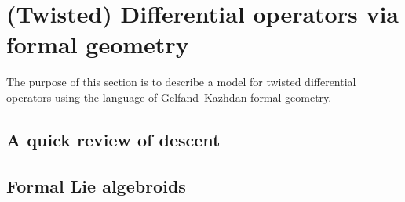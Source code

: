 \section{(Twisted) Differential operators via formal geometry}

The purpose of this section is to describe a model for twisted differential operators using the language of Gelfand--Kazhdan formal geometry. 


\subsection{A quick review of descent}

\subsection{Formal Lie algebroids}

